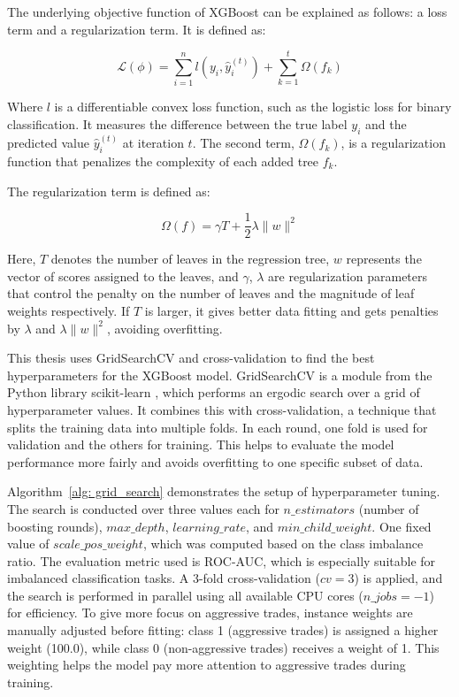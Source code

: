The underlying objective function of XGBoost can be explained as follows: a loss term and a regularization term. It is defined as:

\begin{equation}
\mathcal{L}(\phi) = \sum_{i=1}^{n} l(y_i, \hat{y}_i^{(t)}) + \sum_{k=1}^{t} \Omega(f_k)
\end{equation}

Where $l$ is a differentiable convex loss function, such as the logistic loss for binary classification. It measures the difference between the true label $y_i$ and the predicted value $\hat{y}_i^{(t)}$ at iteration $t$. The second term, $\Omega(f_k)$, is a regularization function that penalizes the complexity of each added tree $f_k$.

The regularization term is defined as:

\begin{equation}
\Omega(f) = \gamma T + \frac{1}{2} \lambda \|w\|^2
\end{equation}

Here, $T$ denotes the number of leaves in the regression tree, $w$ represents the vector of scores assigned to the leaves, and $\gamma$, $\lambda$ are regularization parameters that control the penalty on the number of leaves and the magnitude of leaf weights respectively. If $T$ is larger, it gives better data fitting and gets penalties by $\lambda$ and $\lambda \|w\|^2$, avoiding overfitting.

This thesis uses GridSearchCV and cross-validation to find the best hyperparameters for the XGBoost model. GridSearchCV is a module from the Python library scikit-learn \citep{scikit-learn2011}, which performs an ergodic search over a grid of hyperparameter values. It combines this with cross-validation, a technique that splits the training data into multiple folds. In each round, one fold is used for validation and the others for training. This helps to evaluate the model performance more fairly and avoids overfitting to one specific subset of data. 

Algorithm~\ref{alg: grid_search} demonstrates the setup of hyperparameter tuning. The search is conducted over three values each for $n\_estimators$ (number of boosting rounds), $max\_depth$, $learning\_rate$, and $min\_child\_weight$. One fixed value of $scale\_pos\_weight$, which was computed based on the class imbalance ratio. The evaluation metric used is ROC-AUC, which is especially suitable for imbalanced classification tasks. A 3-fold cross-validation ($cv=3$) is applied, and the search is performed in parallel using all available CPU cores ($n\_jobs=-1$) for efficiency. To give more focus on aggressive trades, instance weights are manually adjusted before fitting: class 1 (aggressive trades) is assigned a higher weight (100.0), while class 0 (non-aggressive trades) receives a weight of 1. This weighting helps the model pay more attention to aggressive trades during training.


